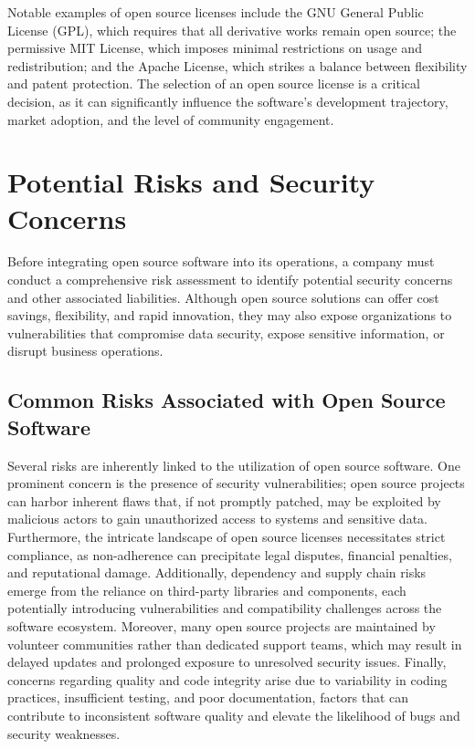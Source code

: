 Notable examples of open source licenses include the GNU General Public License (GPL), which requires that all derivative works remain open source; the permissive MIT License, which imposes minimal restrictions on usage and redistribution; and the Apache License, which strikes a balance between flexibility and patent protection. The selection of an open source license is a critical decision, as it can significantly influence the software’s development trajectory, market adoption, and the level of community engagement.

\cite{Software-Licensing-Types-Thales}


\section{Potential Risks and Security Concerns}

Before integrating open source software into its operations, a company must conduct a comprehensive risk assessment to identify potential security concerns and other associated liabilities. Although open source solutions can offer cost savings, flexibility, and rapid innovation, they may also expose organizations to vulnerabilities that compromise data security, expose sensitive information, or disrupt business operations.

\subsection{Common Risks Associated with Open Source Software}

Several risks are inherently linked to the utilization of open source software. One prominent concern is the presence of security vulnerabilities; open source projects can harbor inherent flaws that, if not promptly patched, may be exploited by malicious actors to gain unauthorized access to systems and sensitive data. Furthermore, the intricate landscape of open source licenses necessitates strict compliance, as non-adherence can precipitate legal disputes, financial penalties, and reputational damage. Additionally, dependency and supply chain risks emerge from the reliance on third-party libraries and components, each potentially introducing vulnerabilities and compatibility challenges across the software ecosystem. Moreover, many open source projects are maintained by volunteer communities rather than dedicated support teams, which may result in delayed updates and prolonged exposure to unresolved security issues. Finally, concerns regarding quality and code integrity arise due to variability in coding practices, insufficient testing, and poor documentation, factors that can contribute to inconsistent software quality and elevate the likelihood of bugs and security weaknesses.

